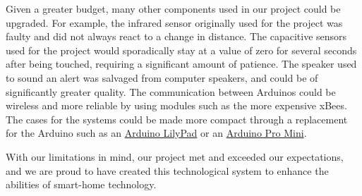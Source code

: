 \documentclass[10pt, oneside, letterpaper, titlepage]{article}
\begin{document}
		Given a greater budget, many other components used in our project could be upgraded. For example, the infrared sensor originally used for the project was faulty and did not always react to a change in distance. The capacitive sensors used for the project would sporadically stay at a value of zero for several seconds after being touched, requiring a significant amount of patience. The speaker used to sound an alert was salvaged from computer speakers, and could be of significantly greater quality. The communication between Arduinos could be wireless and more reliable by using modules such as the more expensive xBees. The cases for the systems could be made more compact through a replacement for the Arduino such as an \href{https://www.arduino.cc/en/Main/ArduinoBoardLilyPad}{Arduino LilyPad} or an \href{https://www.arduino.cc/en/Main/ArduinoBoardProMini}{Arduino Pro Mini}.

		With our limitations in mind, our project met and exceeded our expectations, and we are proud to have created this technological system to enhance the abilities of smart-home technology.
\end{document}
